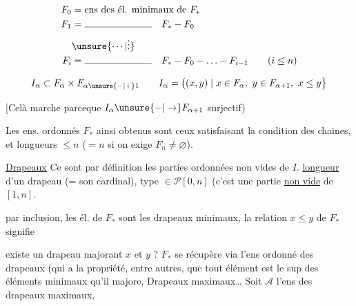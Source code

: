 \[
\begin{aligned}
 F_0&=\text{ens des él. minimaux de }F_*\\
 F_1&=\rule{7em}{.35pt}\quad F_*-F_0\\
 &\unsure{\cdots|\vdots}\\
 F_i&=\rule{7em}{.35pt}\quad F_*-F_0-\ldots-F_{i-1}\qquad(i\leq n)
\end{aligned}
\]


\[
 I_\alpha\subset F_\alpha\times F_{\alpha\unsure{-|+}1}\qquad
 I_\alpha=\bigl((x,y)\mid x\in F_\alpha,\ y\in F_{\alpha+1},\ x\leq y\bigr\}
\]

[Celà marche parceque $I_\alpha\unsure{-|\to} F_{\alpha+1}$ surjectif)

Les ens. ordonnés $F_*$ ainsi obtenus sont  ceux satisfaisant la condition des chaines, et    longueurs  $\leq n$ ($=n$ si on exige $F_n\neq\varnothing$).


 \uline{Drapeaux} Ce sont par définition les parties  ordonnées non vides de $I$. \uline{longueur} d'un drapeau (= son cardinal), type $\in\mathscr P[0,n]$ (c'est une partie \uline{non vide} de $[1,n]$.


par inclusion, les él. de $F_*$ sont les drapeaux minimaux, la relation $x\leq y$ de $F_*$ signifie 


existe un drapeau majorant $x$ et $y$ ?    $F_*$ se récupère via l'ens ordonné des drapeaux (qui a la propriété, entre autres, que tout élément est le sup des éléments minimaux qu'il majore,   Drapeaux maximaux\ldots{} Soit $\mathcal A$ l'ens des drapeaux maximaux,

